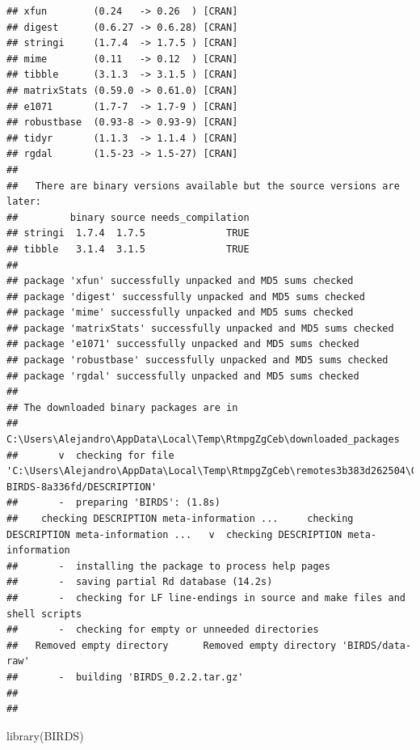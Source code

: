 \documentclass[
  10pt,
]{article}
\newenvironment{Shaded}{\begin{snugshade}}{\end{snugshade}}
\newcommand{\FunctionTok}[1]{\textcolor[rgb]{0.00,0.00,0.00}{#1}}
\newcommand{\NormalTok}[1]{#1}
\begin{document}
\begin{verbatim}
## xfun        (0.24   -> 0.26  ) [CRAN]
## digest      (0.6.27 -> 0.6.28) [CRAN]
## stringi     (1.7.4  -> 1.7.5 ) [CRAN]
## mime        (0.11   -> 0.12  ) [CRAN]
## tibble      (3.1.3  -> 3.1.5 ) [CRAN]
## matrixStats (0.59.0 -> 0.61.0) [CRAN]
## e1071       (1.7-7  -> 1.7-9 ) [CRAN]
## robustbase  (0.93-8 -> 0.93-9) [CRAN]
## tidyr       (1.1.3  -> 1.1.4 ) [CRAN]
## rgdal       (1.5-23 -> 1.5-27) [CRAN]
## 
##   There are binary versions available but the source versions are later:
##         binary source needs_compilation
## stringi  1.7.4  1.7.5              TRUE
## tibble   3.1.4  3.1.5              TRUE
## 
## package 'xfun' successfully unpacked and MD5 sums checked
## package 'digest' successfully unpacked and MD5 sums checked
## package 'mime' successfully unpacked and MD5 sums checked
## package 'matrixStats' successfully unpacked and MD5 sums checked
## package 'e1071' successfully unpacked and MD5 sums checked
## package 'robustbase' successfully unpacked and MD5 sums checked
## package 'rgdal' successfully unpacked and MD5 sums checked
## 
## The downloaded binary packages are in
##  C:\Users\Alejandro\AppData\Local\Temp\RtmpgZgCeb\downloaded_packages
##       v  checking for file 'C:\Users\Alejandro\AppData\Local\Temp\RtmpgZgCeb\remotes3b383d262504\Greensway-BIRDS-8a336fd/DESCRIPTION'
##       -  preparing 'BIRDS': (1.8s)
##    checking DESCRIPTION meta-information ...     checking DESCRIPTION meta-information ...   v  checking DESCRIPTION meta-information
##       -  installing the package to process help pages
##       -  saving partial Rd database (14.2s)
##       -  checking for LF line-endings in source and make files and shell scripts
##       -  checking for empty or unneeded directories
##   Removed empty directory      Removed empty directory 'BIRDS/data-raw'
##       -  building 'BIRDS_0.2.2.tar.gz'
##      
## 
\end{verbatim}

\begin{Shaded}
\begin{Highlighting}[]
\FunctionTok{library}\NormalTok{(BIRDS)}
\end{Highlighting}
\end{Shaded}
\end{document}
